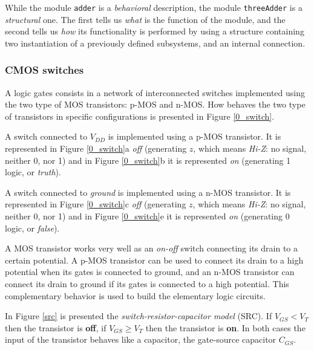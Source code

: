While the module {\tt adder} is a {\em behavioral} description,
the module {\tt threeAdder} is a {\em structural} one. The first
tells us {\em what} is the function of the module, and the second
tells us {\em how} its functionality is performed by using a
structure containing two instantiation of a previously defined
subsystems, and an internal connection.


\subsubsection{CMOS switches}
A logic gates consists in a network of interconnected switches
implemented using the two type of MOS transistors: p-MOS and
n-MOS. How behaves the two type of transistors in specific
configurations is presented in Figure \ref{0_switch}.

A switch connected to $V_{DD}$ is implemented using a p-MOS
transistor. It is represented in Figure \ref{0_switch}a {\em off}
(generating $z$, which means {\em Hi-Z}: no signal, neither 0, nor
1) and in Figure \ref{0_switch}b it is represented {\em on}
(generating 1 logic, or {\em truth}).

A switch connected to {\em ground} is implemented using a n-MOS
transistor. It is represented in Figure \ref{0_switch}c {\em off}
(generating $z$, which means {\em Hi-Z}: no signal, neither 0, nor
1) and in Figure \ref{0_switch}e it is represented {\em on}
(generating 0 logic, or {\em false}).


A MOS transistor works very well as an {\em on-off} switch
connecting its drain to a certain potential.  A p-MOS transistor
can be used to connect its drain to a high potential when its
gates is connected to ground, and an n-MOS transistor can connect
its drain to ground if its gates is connected to a high potential.
This complementary behavior is used to build the elementary logic
circuits.

In Figure \ref{src} is presented the {\em switch-resistor-capacitor
model} (SRC). If $V_{GS} < V_{T}$ then the transistor is {\bf off}, if
$V_{GS} \geq V_{T}$ then the transistor is {\bf on}. In both cases the
input of the transistor behaves like a capacitor, the gate-source
capacitor $C_{GS}$.

